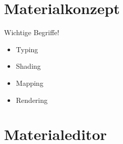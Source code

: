 
\section{Materialkonzept}
Wichtige Begriffe!
\begin{itemize}
\item Typing
\item Shading
\item Mapping
\item Rendering
\end{itemize}


\section{Materialeditor}











